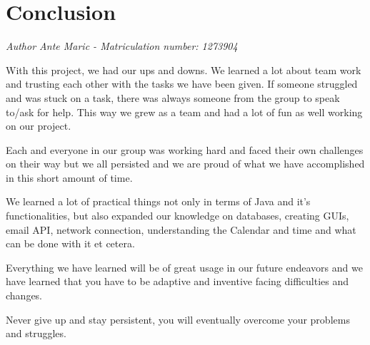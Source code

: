 \chapter{\centering Conclusion}
\emph{Author Ante Maric - Matriculation number: 1273904}
\newline 

With this project, we had our ups and downs. We learned a lot about team work and trusting each other with the tasks we have been given. If someone struggled and was stuck on a task, there was always someone from the group to speak to/ask for help. This way we grew as a team and had a lot of fun as well working on our project. 

Each and everyone in our group was working hard and faced their own challenges on their way but we all persisted and we are proud of what we have accomplished in this short amount of time.  

We learned a lot of practical things not only in terms of Java and it's functionalities, but also expanded our knowledge on databases, creating GUIs, email API, network connection, understanding the Calendar and time and what can be done with it et cetera. 

Everything we have learned will be of great usage in our future endeavors and we have learned that you have to be adaptive and inventive facing difficulties and changes. 

Never give up and stay persistent, you will eventually overcome your problems and struggles.
